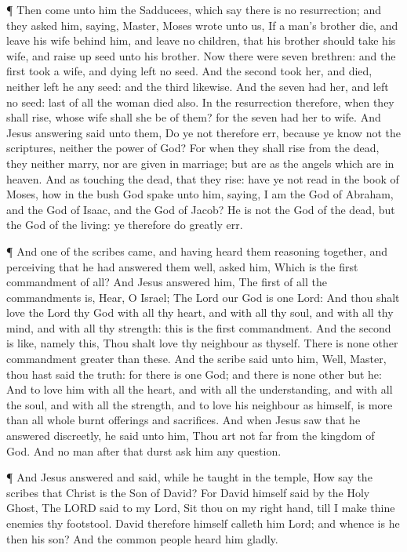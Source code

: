  ¶ Then come unto him the Sadducees, which say there is no
resurrection; and they asked him, saying,  Master, Moses
wrote unto us, If a man's brother die, and leave his wife behind him,
and leave no children, that his brother should take his wife, and raise
up seed unto his brother.  Now there were seven brethren:
and the first took a wife, and dying left no seed.  And the
second took her, and died, neither left he any seed: and the third
likewise.  And the seven had her, and left no seed: last of
all the woman died also.  In the resurrection therefore,
when they shall rise, whose wife shall she be of them? for the seven had
her to wife.  And Jesus answering said unto them, Do ye not
therefore err, because ye know not the scriptures, neither the power of
God?  For when they shall rise from the dead, they neither
marry, nor are given in marriage; but are as the angels which are in
heaven.  And as touching the dead, that they rise: have ye
not read in the book of Moses, how in the bush God spake unto him,
saying, I am the God of Abraham, and the God of Isaac, and the God of
Jacob?  He is not the God of the dead, but the God of the
living: ye therefore do greatly err.

 ¶ And one of the scribes came, and having heard them
reasoning together, and perceiving that he had answered them well, asked
him, Which is the first commandment of all?  And Jesus
answered him, The first of all the commandments is, Hear, O Israel; The
Lord our God is one Lord:  And thou shalt love the Lord thy
God with all thy heart, and with all thy soul, and with all thy mind,
and with all thy strength: this is the first commandment. 
And the second is like, namely this, Thou shalt love thy neighbour as
thyself. There is none other commandment greater than these.
 And the scribe said unto him, Well, Master, thou hast said
the truth: for there is one God; and there is none other but he:
 And to love him with all the heart, and with all the
understanding, and with all the soul, and with all the strength, and to
love his neighbour as himself, is more than all whole burnt offerings
and sacrifices.  And when Jesus saw that he answered
discreetly, he said unto him, Thou art not far from the kingdom of God.
And no man after that durst ask him any question.

 ¶ And Jesus answered and said, while he taught in the
temple, How say the scribes that Christ is the Son of David?
 For David himself said by the Holy Ghost, The LORD said to
my Lord, Sit thou on my right hand, till I make thine enemies thy
footstool.  David therefore himself calleth him Lord; and
whence is he then his son? And the common people heard him gladly.

